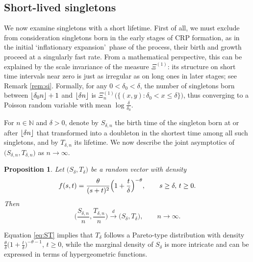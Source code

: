 \documentclass[11pt]{article}
\newcommand{\N}{\mathbb{N}}
\newcommand{\1}[1][]{
	\ifx&#1&\mathds{1}
	\else\mathds{1}\left\{#1\right\}\fi}
\newcommand{\dto}{\overset{d}{\longrightarrow}}
\DeclarePairedDelimiter\floor{\lfloor}{\rfloor}
\newtheorem{proposition}{Proposition}[section]
\theoremstyle{definition}
\theoremstyle{remark}
\numberwithin{equation}{section}
\begin{document}
	
	\subsection{Short-lived singletons}

	We now examine singletons with a short lifetime. First of all, we must exclude from consideration singletons
	born in the early stages of CRP formation, as in the initial \lq inflationary expansion\rq\ phase of the process,
	their birth and growth proceed at a singularly fast rate. From a mathematical perspective, this can be explained
	by the scale invariance of the measure $\Xi^{(1)}$: its structure on short time intervals near zero is just
	as irregular as on long ones in later stages; see Remark \ref{rem:si}. Formally, for any $0 < \delta_0 < \delta$,
	the number of singletons born between $\floor{\delta_0 n}+1$ and $\floor{\delta n}$ is
	$\Xi^{(1)}_n\bigl(\{(x,y): \delta_0 < x \le \delta\}\bigr)$,
	thus converging to a Poisson random variable with mean $\log\frac{\delta}{\delta_0}$.
	
	For $n\in\N$ and $\delta>0$, denote by $S_{\delta,n}$ the birth time of the singleton born at or
	after $\floor{\delta n}$ that transformed into a doubleton in the shortest time among all such singletons,
	and by $T_{\delta,n}$ its lifetime.
	We now describe the joint asymptotics of $\bigl(S_{\delta,n},T_{\delta,n}\bigr)$ as $n\to\infty$.        
	
	\begin{proposition}
		\label{prop:ST}
		Let $\bigl(S_{\delta},T_{\delta}\bigr)$ be a random vector with density
		\begin{equation}
			\label{eq:ST}
			f(s,t) = \frac{\theta}{(s+t)^2}\Bigl(1+\frac{t}{\delta}\Bigr)^{-\theta}, \qquad s\ge\delta,\,t\ge0.
		\end{equation}
		Then
		\begin{equation}
			\label{eq:STconv}
			\biggl(\frac{S_{\delta,n}}{n},\frac{T_{\delta,n}}{n}\biggr) \dto
			\bigl(S_{\delta},T_{\delta}\bigr), \qquad n\to\infty.
		\end{equation}
	\end{proposition}
	
	Equation \eqref{eq:ST} implies that $T_\delta$ follows a Pareto-type distribution with density 
	$\frac{\theta}{\delta}\bigl(1+\frac{t}{\delta}\bigr)^{-\theta-1}$, $t\ge0$,
	while the marginal density of $S_\delta$ is more intricate and can be expressed in terms of hypergeometric functions.
	
\end{document}
